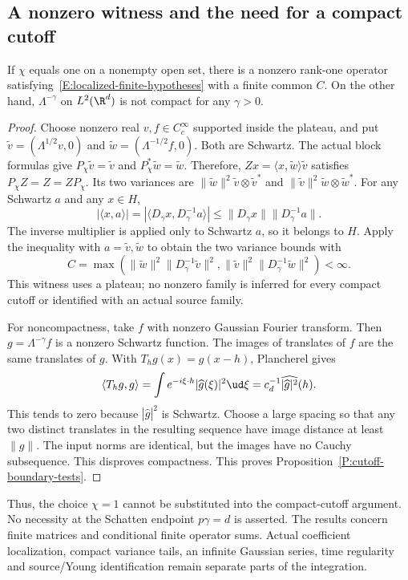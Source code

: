 \subsection{A nonzero witness and the need for a compact cutoff}

\begin{proposition}\label{P:cutoff-boundary-tests}
  If $\chi$ equals one on a nonempty open set, there is a nonzero rank-one
  operator satisfying~\eqref{E:localized-finite-hypotheses} with a finite
  common $C$. On the other hand, $\Lambda^{-\gamma}$ on $L^2(\R^d)$ is
  not compact for any $\gamma > 0$.
\end{proposition}

\begin{proof}
  Choose nonzero real $v,f \in C_c^\infty$ supported inside the plateau,
  and put $\widetilde v=(\Lambda^{1/2}v,0)$ and
  $\widetilde w=(\Lambda^{-1/2}f,0)$. Both are Schwartz. The actual block
  formulas give $P_\chi\widetilde v=\widetilde v$ and
  $P_\chi^*\widetilde w=\widetilde w$. Therefore,
  $Zx=\langle x,\widetilde w\rangle\widetilde v$ satisfies
  $P_\chi Z=Z=ZP_\chi$. Its two variances are
  $\|\widetilde w\|^2\widetilde v\otimes\widetilde v^*$ and
  $\|\widetilde v\|^2\widetilde w\otimes\widetilde w^*$. For any Schwartz
  $a$ and any $x \in H$,
  \[
    |\langle x,a\rangle|
    =|\langle D_\gamma x,D_\gamma^{-1}a\rangle|
    \le\|D_\gamma x\|\|D_\gamma^{-1}a\|.
  \]
  The inverse multiplier is applied only to Schwartz $a$, so it belongs
  to $H$. Apply the inequality with $a=\widetilde v,\widetilde w$ to obtain
  the two variance bounds with
  \[
    C=\max\left(
    \|\widetilde w\|^2\|D_\gamma^{-1}\widetilde v\|^2,
    \|\widetilde v\|^2\|D_\gamma^{-1}\widetilde w\|^2\right)<\infty.
  \]
  This witness uses a plateau; no nonzero family is inferred for every
  compact cutoff or identified with an actual source family.

  For noncompactness, take $f$ with nonzero Gaussian Fourier transform.
  Then $g=\Lambda^{-\gamma}f$ is a nonzero Schwartz function. The images
  of translates of $f$ are the same translates of $g$. With
  $T_hg(x)=g(x-h)$, Plancherel gives
  \[
    \langle T_hg,g\rangle
    =\int e^{-i\xi\cdot h}|\widehat g(\xi)|^2\ud\xi
    =c_d^{-1}\widehat{|\widehat g|^2}(h).
  \]
  This tends to zero because $|\widehat g|^2$ is Schwartz. Choose a large
  spacing so that any two distinct translates in
  the resulting sequence have image distance at least $\|g\|$. The input
  norms are identical, but the images have no Cauchy subsequence. This
  disproves compactness.
  This proves Proposition~\ref{P:cutoff-boundary-tests}.
\end{proof}

Thus, the choice $\chi=1$ cannot be substituted into the compact-cutoff
argument. No necessity at the Schatten endpoint $p\gamma=d$ is asserted.
The results concern finite matrices and conditional finite operator sums.
Actual coefficient localization, compact variance tails, an infinite
Gaussian series, time regularity and source/Young identification remain
separate parts of the integration.
